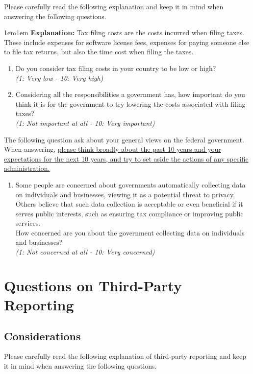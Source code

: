 \documentclass[11pt]{article}
\begin{document}
\noindent Please carefully read the following explanation and keep it in mind when answering the following questions. \\
\begin{adjustwidth}{1em}{1em} \textbf{Explanation:} Tax filing costs are the costs incurred when filing taxes. These include expenses for software license fees, expenses for paying someone else to file tax returns, but also the time cost when filing the taxes. 
\end{adjustwidth}
\begin{enumerate}[resume]
    \item Do you consider tax filing costs in your country to be low or high?\\ 
    \textit{(1: Very low - 10: Very high)}
    \item Considering all the responsibilities a government has, how important do you think it is for the government to try lowering the costs associated with filing taxes? \\ \textit{(1: Not important at all - 10: Very important)}
\end{enumerate}
The following question ask about your general views on the federal government. When answering, \uline{please think broadly about the past 10 years and your expectations for the next 10 years, and try to set aside the actions of any specific administration.}

\begin{enumerate}[resume]
    \item Some people are concerned about governments automatically collecting data on individuals and businesses, viewing it as a potential threat to privacy. Others believe that such data collection is acceptable or even beneficial if it serves public interests, such as ensuring tax compliance or improving public services. \\ How concerned are you about the government collecting data on individuals and businesses?\\
    \textit{(1: Not concerned at all - 10: Very concerned)}
\end{enumerate}

\section*{Questions on Third-Party Reporting}
\subsection*{Considerations}
\noindent Please carefully read the following explanation of third-party reporting and keep it in mind when answering the following questions. \\
\end{document}
